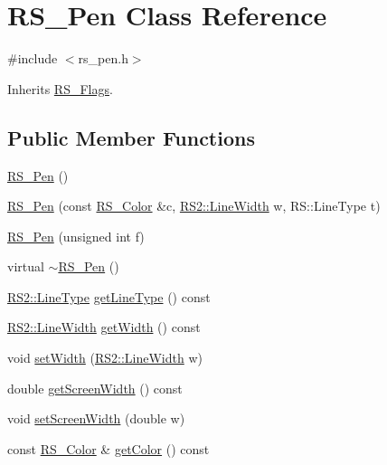 \hypertarget{class_r_s___pen}{\section{R\-S\-\_\-\-Pen Class Reference}
\label{class_r_s___pen}
}


{\ttfamily \#include $<$rs\-\_\-pen.\-h$>$}



Inherits \hyperlink{class_r_s___flags}{R\-S\-\_\-\-Flags}.

\subsection*{Public Member Functions}
\begin{DoxyCompactItemize}
\item 
\hyperlink{class_r_s___pen_acc9112fb19b55df4ab9758650575c36c}{R\-S\-\_\-\-Pen} ()
\item 
\hyperlink{class_r_s___pen_acadb9875183cbc45146b1800ddbbddb1}{R\-S\-\_\-\-Pen} (const \hyperlink{class_r_s___color}{R\-S\-\_\-\-Color} \&c, \hyperlink{class_r_s2_a023485c482c5ee9e36b3dfad781adf29}{R\-S2\-::\-Line\-Width} w, R\-S\-::\-Line\-Type t)
\item 
\hyperlink{class_r_s___pen_a30859ffa70a7fefbce4ee1ae12555f37}{R\-S\-\_\-\-Pen} (unsigned int f)
\item 
virtual \hyperlink{class_r_s___pen_a5066b1b53f1a483cb548f3fc4a03df2b}{$\sim$\-R\-S\-\_\-\-Pen} ()
\item 
\hyperlink{class_r_s2_a6f3a82972c2d62456f6cacb74e14c95f}{R\-S2\-::\-Line\-Type} \hyperlink{class_r_s___pen_ade7422230225e3ddf3b1ca4dffa6fd11}{get\-Line\-Type} () const 
\item 
\hyperlink{class_r_s2_a023485c482c5ee9e36b3dfad781adf29}{R\-S2\-::\-Line\-Width} \hyperlink{class_r_s___pen_a3b75438a52d455e408f28699f38b0e5e}{get\-Width} () const 
\item 
void \hyperlink{class_r_s___pen_ac92f53a8f9c4118b33a6d0fd1462f34a}{set\-Width} (\hyperlink{class_r_s2_a023485c482c5ee9e36b3dfad781adf29}{R\-S2\-::\-Line\-Width} w)
\item 
double \hyperlink{class_r_s___pen_a440b941b50242b900a855ca9ed4d22ea}{get\-Screen\-Width} () const 
\item 
void \hyperlink{class_r_s___pen_a33fb782ac3ae1ef3da39b4ca3973adf2}{set\-Screen\-Width} (double w)
\item 
const \hyperlink{class_r_s___color}{R\-S\-\_\-\-Color} \& \hyperlink{class_r_s___pen_aac31445139e36e2bf3aea062c5d80f0f}{get\-Color} () const 

\end{DoxyCompactItemize}
